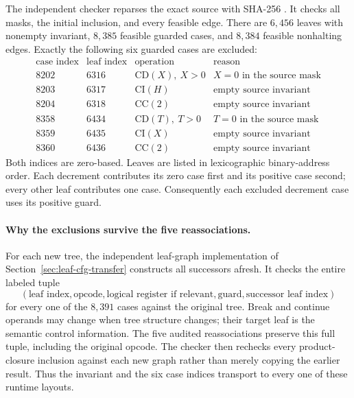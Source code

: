 The independent checker reparses the exact source with SHA-256
.
It checks all masks, the initial inclusion, and every feasible edge.
There are $6,456$ leaves with nonempty invariant, $8,385$ feasible
guarded cases, and $8,384$ feasible nonhalting edges.  Exactly the
following six guarded cases are excluded:
\[
\begin{array}{r|r|l|l}
\text{case index}&\text{leaf index}&\text{operation}&\text{reason}\\\hline
8202&6316&\mathrm{CD}(X),\ X>0&X=0\text{ in the source mask}\\
8203&6317&\mathrm{CI}(H)&\text{empty source invariant}\\
8204&6318&\mathrm{CC}(2)&\text{empty source invariant}\\
8358&6434&\mathrm{CD}(T),\ T>0&T=0\text{ in the source mask}\\
8359&6435&\mathrm{CI}(X)&\text{empty source invariant}\\
8360&6436&\mathrm{CC}(2)&\text{empty source invariant}
\end{array}
\]
Both indices are zero-based.  Leaves are listed in lexicographic
binary-address order.  Each decrement contributes its zero case first
and its positive case second; every other leaf contributes one case.
Consequently each excluded decrement case uses its positive guard.

\paragraph{Why the exclusions survive the five reassociations.}
For each new tree, the independent leaf-graph implementation of
Section~\ref{sec:leaf-cfg-transfer} constructs all successors afresh.
It checks the entire labeled tuple
\[
 (\text{leaf index},\text{opcode},\text{logical register if relevant},
   \text{guard},\text{successor leaf index})
\]
for every one of the $8,391$ cases against the original tree.
Break and continue operands may change when tree structure changes;
their target leaf is the semantic control information.  The five
audited reassociations preserve this full tuple, including the original
opcode.  The checker then rechecks every product-closure inclusion
against each new graph rather than merely copying the earlier result.
Thus the invariant and the six case indices transport to every one
of these runtime layouts.

